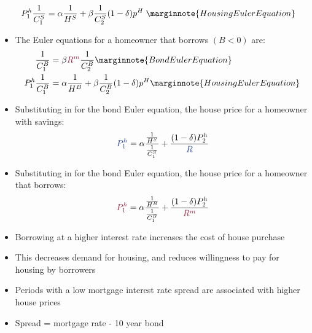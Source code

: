 \documentclass[a4paper]{article}
\begin{document}
\begin{itemize}
\begin{align*}
			P_1^h\frac{1}{C_1^S} &= \alpha\frac{1}{H^S}+\beta\frac{1}{C_2^S}(1-\delta)p^H \;\marginnote{Housing Euler Equation}
		\end{align*}
		\item The Euler equations for a homeowner that \textcolor{myred}{borrows} \( (B<0) \) are:
		\begin{align*}
			\frac{1}{C_1^B} &= \beta\textcolor{myred}{R^m}\frac{1}{C_2^B}\marginnote{Bond Euler Equation}\\
			P_1^h\frac{1}{C_1^B} &= \alpha\frac{1}{H^B}+\beta\frac{1}{C_2^B}(1-\delta)p^H\marginnote{Housing Euler Equation}
		\end{align*}
		\item Substituting in for the bond Euler equation, the house price for a homeowner with \textcolor{myblue}{savings}:
		\[
			\textcolor{myblue}{P_1^h} = \alpha\frac{\frac{1}{H^S}}{\frac{1}{C_1^S}}+\frac{(1-\delta)P_2^h}{\textcolor{myblue}{R}}
		\]
		\item Substituting in for the bond Euler equation, the house price for a homeowner that \textcolor{myred}{borrows}:
		\[
			\textcolor{myred}{P_1^h} = \alpha\frac{\frac{1}{H^B}}{\frac{1}{C^B_1}} + \frac{(1-\delta)P_2^h}{\textcolor{myred}{R^m}}
		\]
		\item Borrowing at a higher interest rate increases the cost of house purchase
		\item This decreases demand for housing, and reduces willingness to pay for housing by borrowers
		\item Periods with a low mortgage interest rate \textcolor{myblue}{spread} are associated with higher house prices
		\item \textcolor{myblue}{Spread} = mortgage rate - 10 year bond
	\end{itemize}
\end{document}
